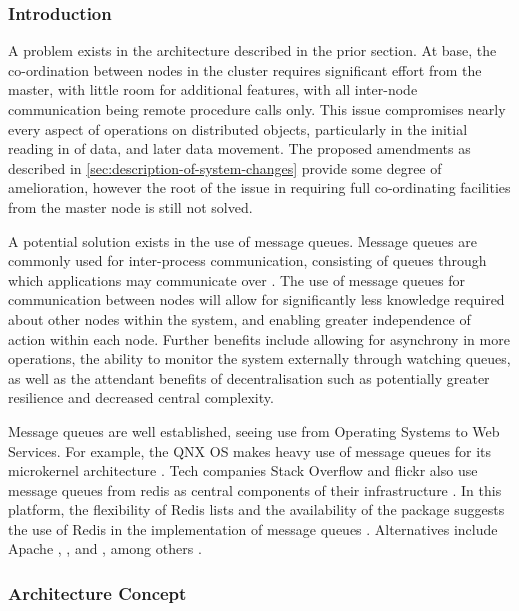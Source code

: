\subsubsection{Introduction}\label{subsubsec:cmq-introduction}

A problem exists in the architecture described in the prior section.
At base, the co-ordination between nodes in the cluster requires significant effort from the master, with little room for additional features, with all inter-node communication being remote procedure calls only.
This issue compromises nearly every aspect of operations on distributed objects, particularly in the initial reading in of data, and later data movement.
The proposed amendments as described in \cref{sec:description-of-system-changes} provide some degree of amelioration, however the root of the issue in requiring full co-ordinating facilities from the master node is still not solved.

A potential solution exists in the use of message queues.
Message queues are commonly used for inter-process communication, consisting of queues through which applications may communicate over \cite{curry2004message}.
The use of message queues for communication between nodes will allow for significantly less knowledge required about other nodes within the system, and enabling greater independence of action within each node.
Further benefits include allowing for asynchrony in more operations, the ability to monitor the system externally through watching queues, as well as the attendant benefits of decentralisation such as potentially greater resilience and decreased central complexity.

Message queues are well established, seeing use from Operating Systems to Web Services.
For example, the QNX OS makes heavy use of message queues for its microkernel architecture \cite{hildebrand1992qnx}.
Tech companies Stack Overflow and flickr also use message queues from redis as central components of their infrastructure \cites{nolan2011flickr,montrose2016stack}.
In this platform, the flexibility of Redis lists and the availability of the  package suggests the use of Redis in the implementation of message queues \cite{sanfilippo2009redis,urbanek2020rediscc}.
Alternatives include Apache , , and , among others \cites{snyder2011activemq,garg2013kafka,sanfilippo2016disque}.

\subsubsection{Architecture Concept}\label{architecture-concept}


